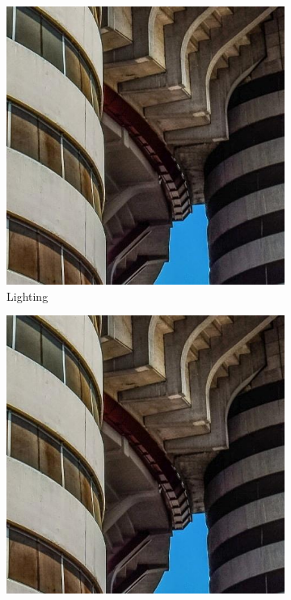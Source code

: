 \begin{figure}[ht]
\begin{subfigure}[b]{0.24\textwidth}
        \includegraphics[width=\textwidth]{img/Original.jpg}
        \caption{Lighting}
        \label{fig:lighting}
    \end{subfigure}
    \hfill
    \begin{subfigure}[b]{0.24\textwidth}
        \includegraphics[width=\textwidth]{img/Original.jpg}

\end{subfigure}
\end{figure}
